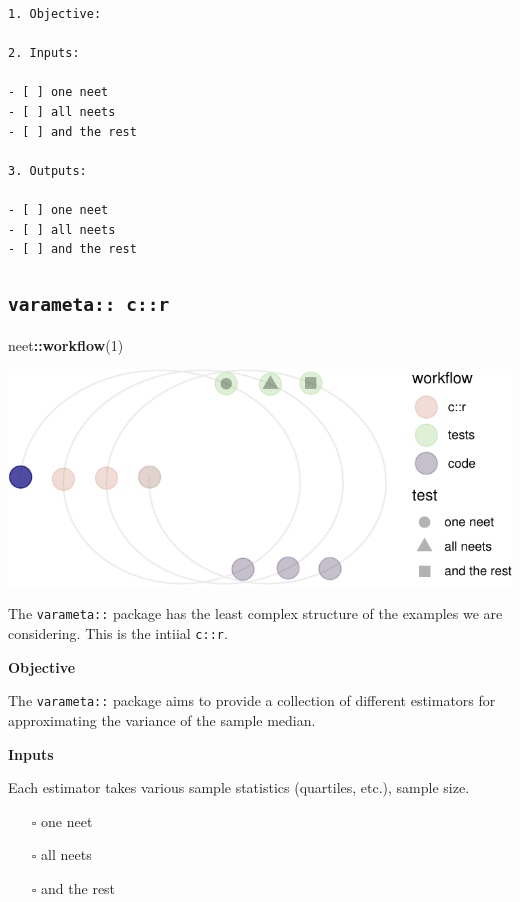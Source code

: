 \documentclass[
]{article}
\newenvironment{Shaded}{\begin{snugshade}}{\end{snugshade}}
\newcommand{\DecValTok}[1]{\textcolor[rgb]{0.00,0.00,0.81}{#1}}
\newcommand{\KeywordTok}[1]{\textcolor[rgb]{0.13,0.29,0.53}{\textbf{#1}}}
\newcommand{\NormalTok}[1]{#1}
\newcommand{\OperatorTok}[1]{\textcolor[rgb]{0.81,0.36,0.00}{\textbf{#1}}}
\providecommand{\tightlist}{%
  \setlength{\itemsep}{0pt}\setlength{\parskip}{0pt}}
\begin{document}
\begin{verbatim}
1. Objective:

2. Inputs:

- [ ] one neet
- [ ] all neets
- [ ] and the rest

3. Outputs:

- [ ] one neet
- [ ] all neets
- [ ] and the rest
\end{verbatim}

\hypertarget{varameta-cr}{%
\subsection{\texorpdfstring{\texttt{varameta::\ c::r}}{varameta:: c::r}}\label{varameta-cr}}

\begin{Shaded}
\begin{Highlighting}[]
\NormalTok{neet}\OperatorTok{::}\KeywordTok{workflow}\NormalTok{(}\DecValTok{1}\NormalTok{)}
\end{Highlighting}
\end{Shaded}

\begin{center}\includegraphics{when-is-done-done_files/figure-latex/unnamed-chunk-10-1} \end{center}

The \texttt{varameta::} package has the least complex structure of the examples we are considering. This is the intiial \texttt{c::r}.

\textbf{Objective}

The \texttt{varameta::} package aims to provide a collection of different estimators for approximating the variance of the sample median.

\textbf{Inputs}

Each estimator takes various sample statistics (quartiles, etc.), sample size.

\begin{itemize}
\tightlist
\item[$\square$]
  one neet
\item[$\square$]
  all neets
\item[$\square$]
  and the rest
\end{itemize}
\end{document}
